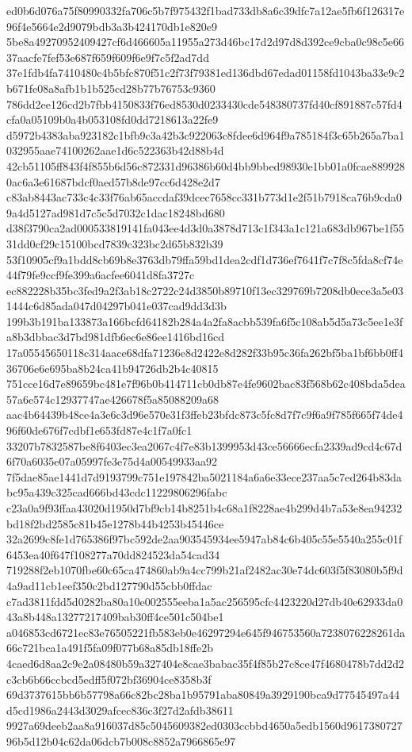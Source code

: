 \documentclass[11pt,a4paper]{article}
\begin{document}
{ed0b6d076a75f80990332fa706c5b7f975432f1bad733db8a6c39dfc7a12ae5fb6f126317e96f4e5664e2d9079bdb3a3b424170db1e820e9
5be8a49270952409427cf6d466605a11955a273d46bc17d2d97d8d392ce9cba0c98c5e6637aacfe7fef53e687f659f609f6e9f7c5f2ad7dd
37e1fdb4fa7410480c4b5bfc870f51c2f73f79381ed136dbd67edad01158fd1043ba33e9c2b671fe08a8afb1b1b525cd28b77b76753c9360
786dd2ee126cd2b7fbb4150833f76ed8530d0233430cde548380737fd40cf891887c57fd4cfa0a05109b0a4b053108fd0dd7218613a22fe9
d5972b4383aba923182c1bfb9c3a42b3c922063c8fdee6d964f9a785184f3c65b265a7ba1032955aae74100262aae1d6c522363b42d88b4d
42cb51105ff843f4f855b6d56c872331d96386b60d4bb9bbed98930e1bb01a0fcae8899280ac6a3e61687bdcf0aed57b8de97cc6d428e2d7
c83ab8443ac733c4c33f76ab65accdaf39dcec7658cc331b773d1e2f51b7918ca76b9cda09a4d5127ad981d7c5c5d7032c1dac18248bd680
d38f3790ca2ad000533819141fa043ee4d3d0a3878d713c1f343a1c121a683db967be1f5531dd0cf29c15100bcd7839c323bc2d65b832b39
53f10905cf9a1bdd8cb69b8e3763db79ffa59bd1dea2cdf1d736ef7641f7c7f8c5fda8cf74e44f79fe9ccf9fe399a6acfee6041d8fa3727c
ec882228b35bc3fed9a2f3ab18c2722c24d3850b89710f13ec329769b7208db0ece3a5e031444c6d85ada047d04297b041e037cad9dd3d3b
199b3b191ba133873a166bcfd64182b284a4a2fa8acbb539fa6f5c108ab5d5a73c5ee1e3fa8b3dbbac3d7bd981dfb6ec6e86ee1416bd16cd
17a05545650118c314aace68dfa71236e8d2422e8d282f33b95c36fa262bf5ba1bf6bb0ff436706e6e695ba8b24ca41b94726db2b4c40815
751cce16d7e89659bc481e7f96b0b414711cb0db87e4fe9602bac83f568b62c408bda5dea57a6e574c12937747ae426678f5a85088209a68
aac4b64439b48ce4a3e6c3d96e570e31f3ffeb23bfdc873c5fc8d7f7c9f6a9f785f665f74de496f60de676f7cdbf1e653fd87e4c1f7a0fc1
33207b7832587be8f6403ec3ea2067c4f7e83b1399953d43ce56666ecfa2339ad9cd4c67d6f70a6035e07a05997fe3e75d4a00549933aa92
7f5dae85ae1441d7d9193799c751e197842ba5021184a6a6e33ece237aa5c7ed264b83dabc95a439c325cad666bd43cdc11229806296fabc
c23a0a9f93ffaa43020d1950d7bf9cb14b8251b4c68a1f8228ae4b299d4b7a53e8ea94232bd18f2bd2585c81b45e1278b44b4253b45446ce
32a2699c8fe1d765386f97bc592de2aa903545934ee5947ab84c6b405c55e5540a255c01f6453ea40f647f108277a70dd824523da54cad34
719288f2eb1070fbe60c65ca474860ab9a4cc799b21af2482ac30e74dc603f5f83080b5f9d4a9ad11cb1eef350c2bd127790d55cbb0ffdac
c7ad3811fdd5d0282ba80a10e002555eeba1a5ac256595cfc4423220d27db40e62933da043a8b448a13277217409bab30ff4ce501c504be1
a046853cd6721ec83e76505221fb583eb0e46297294e645f946753560a7238076228261da66c721bca1a491f5fa09f077b68a85db18ffe2b
4caed6d8aa2c9e2a08480b59a327404e8cae3babac35f4f85b27c8ce47f4680478b7dd2d2c3cb6b66ccbcd5edff5f072bf36904ce8358b3f
69d3737615bb6b57798a66c82bc28ba1b95791aba80849a3929190bca9d77545497a44d5cd1986a2443d3029afcec836c3f27d2afdb38611
9927a69deeb2aa8a916037d85c5045609382ed0303ccbbd4650a5edb1560d961738072796b5d12b04c62da06dcb7b008c8852a7966865e97
}
\end{document}

